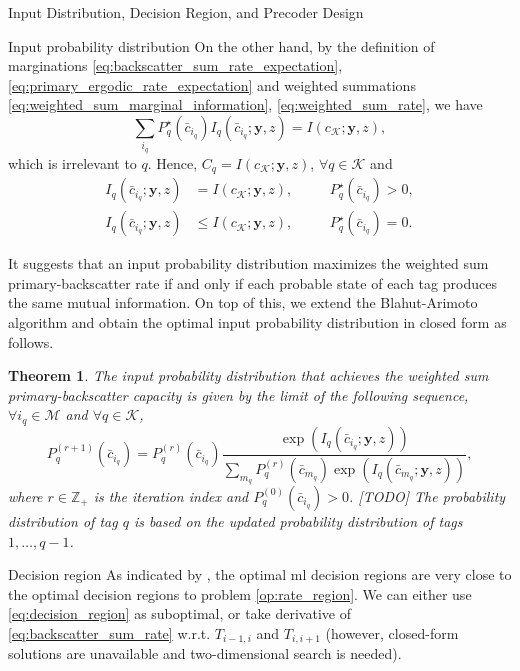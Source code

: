 \documentclass[journal]{IEEEtran}
\newtheorem{theorem}{Theorem}
\begin{document}
\begin{section}{Input Distribution, Decision Region, and Precoder Design}
\begin{subsection}{Input probability distribution}
			On the other hand, by the definition of marginations \eqref{eq:backscatter_sum_rate_expectation}, \eqref{eq:primary_ergodic_rate_expectation} and weighted summations \eqref{eq:weighted_sum_marginal_information}, \eqref{eq:weighted_sum_rate}, we have
			\begin{equation}
				\sum_{i_q} P_q^{\star}(\bar{c}_{i_q}) I_q(\bar{c}_{i_q};\boldsymbol{y},z) = I(c_{\mathcal{K}};\boldsymbol{y},z),
			\end{equation}
			which is irrelevant to $q$. Hence, $C_q = I(c_{\mathcal{K}};\boldsymbol{y},z)$, $\forall q \in \mathcal{K}$ and
			\begin{subequations}
				\begin{alignat}{2}
					I_q(\bar{c}_{i_q};\boldsymbol{y},z) & = I(c_{\mathcal{K}};\boldsymbol{y},z), \quad && P_q^{\star}(\bar{c}_{i_q}) > 0,\\
					I_q(\bar{c}_{i_q};\boldsymbol{y},z) & \le I(c_{\mathcal{K}};\boldsymbol{y},z), \quad && P_q^{\star}(\bar{c}_{i_q}) = 0.
				\end{alignat}
			\end{subequations}

			It suggests that an input probability distribution maximizes the weighted sum primary-backscatter rate if and only if each probable state of each tag produces the same mutual information. On top of this, we extend the Blahut-Arimoto algorithm and obtain the optimal input probability distribution in closed form as follows.

			\begin{theorem}
				The input probability distribution that achieves the weighted sum primary-backscatter capacity is given by the limit of the following sequence, $\forall i_q \in \mathcal{M}$ and $\forall q \in \mathcal{K}$,
				\begin{equation}
					P_q^{(r+1)}(\bar{c}_{i_q}) = P_q^{(r)}(\bar{c}_{i_q}) \frac{\exp \left( I_q(\bar{c}_{i_q};\boldsymbol{y},z) \right)}{\sum_{m_q} P_q^{(r)}(\bar{c}_{m_q}) \exp \left( I_q(\bar{c}_{m_q};\boldsymbol{y},z) \right)},
				\end{equation}
				where $r \in \mathbb{Z}_+$ is the iteration index and $P_q^{(0)}(\bar{c}_{i_q}) > 0$. [TODO] The probability distribution of tag $q$ is based on the updated probability distribution of tags $1,\ldots,q-1$.
			\end{theorem}
		\end{subsection}


		\begin{subsection}{Decision region}
			As indicated by \cite{Qian2019b}, the optimal \gls{ml} decision regions are very close to the optimal decision regions to problem \eqref{op:rate_region}. We can either use \eqref{eq:decision_region} as suboptimal, or take derivative of \eqref{eq:backscatter_sum_rate} w.r.t. $T_{i-1,i}$ and $T_{i,i+1}$ (however, closed-form solutions are unavailable and two-dimensional search is needed).
		\end{subsection}


\end{section}
\end{document}
